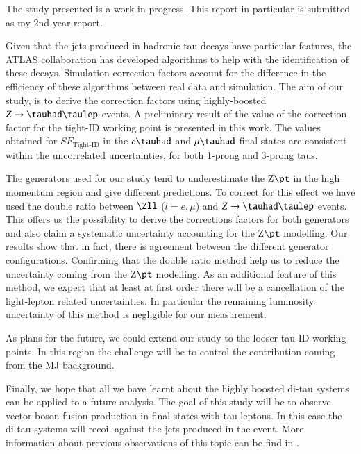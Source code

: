 The study presented is a work in progress. This report in particular is submitted as my 2nd-year report.

Given that the jets produced in hadronic tau decays have particular features, the ATLAS collaboration has developed algorithms to help with the identification of these decays. Simulation correction factors account for the difference in the efficiency of these algorithms between real data and simulation. The aim of our study, is to derive the correction factors using highly-boosted $Z\to\tauhad\taulep$ events. A preliminary result of the value of the correction factor for the tight-ID working point is presented in this work. The values obtained for $SF_{\text{Tight-ID}}$ in the $e\tauhad$ and $\mu\tauhad$ final states are consistent within the uncorrelated uncertainties, for both 1-prong and 3-prong taus.


The generators used for our study tend to underestimate the Z$\pt$ in the high momentum region and give different predictions. To correct for this effect we have used the double ratio between $\Zll$ ($l=e,\mu$) and $Z\to\tauhad\taulep$ events. This offers us the possibility to derive the corrections factors for both generators and also claim a systematic uncertainty accounting for the Z$\pt$ modelling. Our results show that in fact, there is agreement between the different generator configurations. Confirming that the double ratio method help us to reduce the uncertainty coming from the Z$\pt$ modelling. As an additional feature of this method, we expect that at least at first order there will be a cancellation of the light-lepton related uncertainties. In particular the remaining luminosity uncertainty of this method is negligible for our measurement.


As plans for the future, we could extend our study to the looser tau-ID working points. In this region the challenge will be to control the contribution coming from the MJ background. 

Finally, we hope that all we have learnt about the highly boosted di-tau systems can be applied to a future analysis.  The goal of this study will be to observe vector boson fusion production in final states with tau leptons. In this case the di-tau systems will recoil against the jets produced in the event. More information about previous observations of this topic can be find in \cite{Aad:2014dta,Aaboud:2017emo}. 